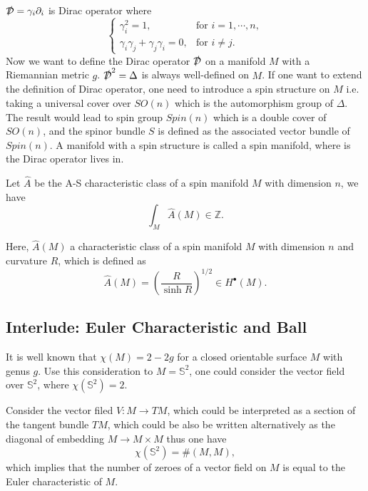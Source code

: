 \documentclass[10pt]{article}
\begin{document}
$ \slashed{\mathcal{D}} = \gamma_{i} \partial_{i}$ is Dirac operator where
\begin{equation*}
  \begin{cases}
    \gamma_{i}^{2} = 1, & \text{for } i = 1, \cdots , n,\\
    \gamma_{i} \gamma_{j} + \gamma_{j} \gamma_{i} = 0, & \text{for } i \neq j.
  \end{cases}
\end{equation*}
Now we want to define the Dirac operator $ \slashed{\mathcal{D}}$ on a manifold $ M$ with a Riemannian metric $ g$.
$\slashed{\mathcal{D}} ^{2} = \Delta$ is always well-defined on $ M$.
If one want to extend the definition of Dirac operator, one need to introduce a spin structure on $ M$ i.e. taking a universal cover over $ SO(n) $ which is the automorphism group of $ \Delta$.
The result would lead to spin group $ Spin(n)$ which is a double cover of $ SO(n)$, and the spinor bundle $ S$ is defined as the associated vector bundle of $ Spin(n)$.
A manifold with a spin structure is called a spin manifold, where is the Dirac operator lives in.
\begin{theorem}
  Let $ \hat{A}$ be the A-S characteristic class of a spin manifold $ M$ with dimension $ n$, we have
  \begin{equation*}
    \int _{M} \hat{A}(M) \in \mathbb{Z}.
  \end{equation*}
\end{theorem}
Here, $ \hat{A}(M)$ a characteristic class of a spin manifold $ M$ with dimension $ n$ and curvature $ R$, which is defined as
\begin{equation*}
  \hat{A}(M) = \left( \frac{R}{\sinh R} \right)^{1 / 2} \in H^{\bullet}(M).
\end{equation*}

\subsection{Interlude: Euler Characteristic and Ball}

It is well known that $ \chi(M) = 2 - 2g$ for a closed orientable surface $ M$ with genus $ g$. Use this consideration to $ M = \mathbb{S}^{2}$, one could consider the vector field over $ \mathbb{S}^{2}$, where $ \chi(\mathbb{S}^{2}) = 2$.

Consider the vector filed $ V : M \rightarrow T M$, which could be interpreted as a section of the tangent bundle $ TM$, which could be also be written alternatively as the diagonal of embedding $ M \rightarrow M \times M$ thus one have
\begin{equation*}
  \chi(\mathbb{S}^{2}) = \# (M, M),
\end{equation*}
which implies that the number of zeroes of a vector field on $ M$ is equal to the Euler characteristic of $ M$.
\end{document}
